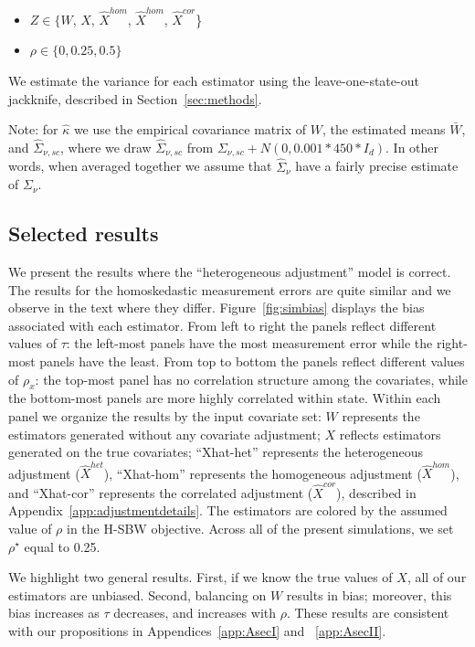 \begin{itemize}
    \item $Z \in \{W$, $X$, $\hat{X}^{hom}$, $\hat{X}^{hom}$, $\hat{X}^{cor}$\}
    \item $\rho \in \{0, 0.25, 0.5\}$
\end{itemize}

We estimate the variance for each estimator using the leave-one-state-out jackknife, described in Section~\ref{sec:methods}. 

Note: for $\hat{\kappa}$ we use the empirical covariance matrix of $W$, the estimated means $\bar{W}$, and $\hat{\Sigma}_{\nu, sc}$, where we draw $\hat{\Sigma}_{\nu, sc}$ from $\Sigma_{\nu, sc} + N(0, 0.001*450*I_d)$. In other words, when averaged together we assume that $\hat{\Sigma}_{\nu}$ have a fairly precise estimate of $\Sigma_{\nu}$.

\subsection{Selected results}\label{ssec:resultsI}

We present the results where the ``heterogeneous adjustment'' model is correct. The results for the homoskedastic measurement errors are quite similar and we observe in the text where they differ. Figure~\ref{fig:simbias} displays the bias associated with each estimator. From left to right the panels reflect different values of $\tau$: the left-most panels have the most measurement error while the right-most panels have the least. From top to bottom the panels reflect different values of $\rho_x$: the top-most panel has no correlation structure among the covariates, while the bottom-most panels are more highly correlated within state. Within each panel we organize the results by the input covariate set: $W$ represents the estimators generated without any covariate adjustment; $X$ reflects estimators generated on the true covariates; ``Xhat-het'' represents the heterogeneous adjustment ($\hat{X}^{het}$), ``Xhat-hom'' represents the homogeneous adjustment ($\hat{X}^{hom}$), and ``Xhat-cor'' represents the correlated adjustment ($\hat{X}^{cor}$), described in Appendix~\ref{app:adjustmentdetails}. The estimators are colored by the assumed value of $\rho$ in the H-SBW objective. Across all of the present simulations, we set $\rho^\star$ equal to 0.25.

We highlight two general results. First, if we know the true values of $X$, all of our estimators are unbiased. Second, balancing on $W$ results in bias; moreover, this bias increases as $\tau$ decreases, and increases with $\rho$.  These results are consistent with our propositions in Appendices~\ref{app:AsecI} and ~\ref{app:AsecII}.

